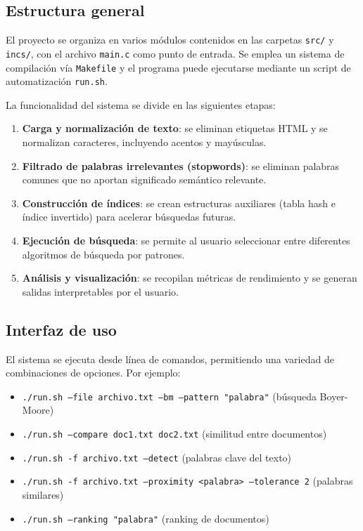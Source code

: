 \documentclass[9pt,letterpaper,onecolumn]{rho-class/rho}
\begin{document}
\subsection{Estructura general}

El proyecto se organiza en varios módulos contenidos en las carpetas \texttt{src/} y \texttt{incs/}, con el archivo \texttt{main.c} como punto de entrada. Se emplea un sistema de compilación vía \texttt{Makefile} y el programa puede ejecutarse mediante un script de automatización \texttt{run.sh}.

La funcionalidad del sistema se divide en las siguientes etapas:

\begin{enumerate}
  \item \textbf{Carga y normalización de texto}: se eliminan etiquetas HTML y se normalizan caracteres, incluyendo acentos y mayúsculas.
  \item \textbf{Filtrado de palabras irrelevantes (stopwords)}: se eliminan palabras comunes que no aportan significado semántico relevante.
  \item \textbf{Construcción de índices}: se crean estructuras auxiliares (tabla hash e índice invertido) para acelerar búsquedas futuras.
  \item \textbf{Ejecución de búsqueda}: se permite al usuario seleccionar entre diferentes algoritmos de búsqueda por patrones.
  \item \textbf{Análisis y visualización}: se recopilan métricas de rendimiento y se generan salidas interpretables por el usuario.
\end{enumerate}

\subsection{Interfaz de uso}

El sistema se ejecuta desde línea de comandos, permitiendo una variedad de combinaciones de opciones. Por ejemplo:

\begin{itemize}
  \item \texttt{./run.sh --file archivo.txt --bm --pattern "palabra"} \hfill (búsqueda Boyer-Moore)
  \item \texttt{./run.sh --compare doc1.txt doc2.txt} \hfill (similitud entre documentos)
  \item \texttt{./run.sh -f archivo.txt --detect} \hfill (palabras clave del texto)
  \item \texttt{./run.sh -f archivo.txt --proximity <palabra>  --tolerance 2} \hfill (palabras similares)
  \item \texttt{./run.sh --ranking "palabra"} \hfill (ranking de documentos)
\end{itemize}
\end{document}
